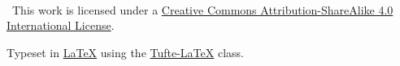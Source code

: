 \documentclass[a4paper,oneside,marginals=justified,nobib]{tufte-book}
\newcommand{\monthyear}{\ifcase\month\or January\or February\or March\or 
April\or May\or June\or July\or August\or September\or October\or 
November\or December\fi\space\number\year} %
\begin{document}

\newpage
~\vfill
\thispagestyle{empty}
\setlength{\parindent}{0pt}
\setlength{\parskip}{\baselineskip}

\ccbysa\ This work is licensed under a 
\href{http://creativecommons.org/licenses/by-sa/4.0/}
{Creative Commons Attribution-ShareAlike 4.0 International License}.

\par Typeset in \href{ttps://www.latex-project.org/}{\LaTeX} using the 
\href{https://tufte-latex.github.io/tufte-latex/}{Tufte-LaTeX} class.



\renewcommand{\baselinestretch}{0.75}\normalsize
\tableofcontents %
\listoffigures %
\listoftables %
\listoftodos
\renewcommand{\baselinestretch}{1.0}\normalsize

\end{document}
